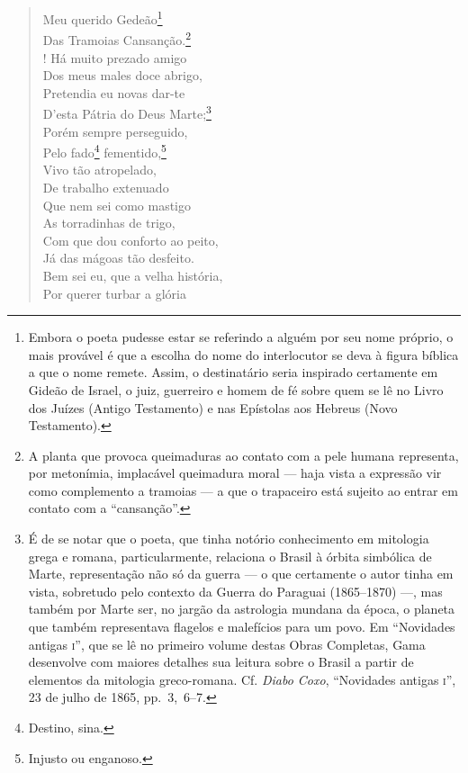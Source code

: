 \begin{verse}
Meu querido Gedeão\footnote{ Embora o poeta pudesse estar se
  referindo a alguém por seu nome próprio, o mais provável é que a
  escolha do nome do interlocutor se deva à figura bíblica a que o nome
  remete. Assim, o destinatário seria inspirado certamente em Gideão de
  Israel, o juiz, guerreiro e homem de fé sobre quem se lê no Livro dos
  Juízes (Antigo Testamento) e nas Epístolas aos Hebreus (Novo
  Testamento).}\\
Das Tramoias Cansanção.\footnote{ A planta que provoca queimaduras ao
  contato com a pele humana representa, por metonímia, implacável
  queimadura moral --- haja vista a expressão vir como complemento a
  tramoias --- a que o trapaceiro está sujeito ao entrar em contato com a
  ``cansanção''.}\\!
Há muito prezado amigo\\
Dos meus males doce abrigo,\\
Pretendia eu novas dar-te\\
D'esta Pátria do Deus Marte;\footnote{ É de se notar que o poeta, que
  tinha notório conhecimento em mitologia grega e romana,
  particularmente, relaciona o Brasil à órbita simbólica de Marte,
  representação não só da guerra --- o que certamente o autor tinha em
  vista, sobretudo pelo contexto da Guerra do Paraguai (1865--1870) ---,
  mas também por Marte ser, no jargão da astrologia mundana da época, o
  planeta que também representava flagelos e malefícios para um povo. Em
  ``Novidades antigas \textsc{i}'', que se lê no primeiro volume destas
  Obras Completas, Gama desenvolve com maiores detalhes sua leitura
  sobre o Brasil a partir de elementos da mitologia greco-romana. Cf.
  \emph{Diabo Coxo}, ``Novidades antigas \textsc{i}'', 23 de julho de 1865, pp.~3,~6--7.}\\
Porém sempre perseguido,\\
Pelo fado\footnote{ Destino, sina.} fementido,\footnote{ Injusto
  ou enganoso.}\\
Vivo tão atropelado,\\
De trabalho extenuado\\
Que nem sei como mastigo\\
As torradinhas de trigo,\\
Com que dou conforto ao peito,\\
Já das mágoas tão desfeito.\\
Bem sei eu, que a velha história,\\
Por querer turbar a glória\\

\end{verse}
